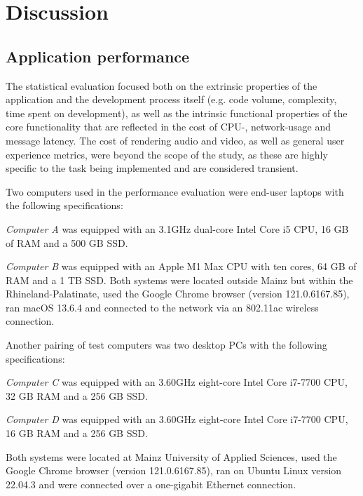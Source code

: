 \chapter{Discussion}
\label{ch:discussion}


\section{Application performance}
\label{sec:statistics}

The statistical evaluation focused both on the extrinsic properties of the application and the development process itself (e.g. code volume, complexity, time spent on development), as well as the intrinsic functional properties of the core functionality that are reflected in the cost of \ac{CPU}-, network-usage and message latency.
The cost of rendering audio and video, as well as general user experience metrics, were beyond the scope of the study, as these are highly specific to the task being implemented and are considered transient.

Two computers used in the performance evaluation were end-user laptops with the following specifications:

\emph{Computer A} was equipped with an 3.1GHz dual-core Intel Core i5 \ac{CPU}, 16 \ac{GB} of \ac{RAM} and a 500 \ac{GB} \ac{SSD}.

\emph{Computer B} was equipped with an Apple M1 Max \ac{CPU} with ten cores, 64 \ac{GB} of \ac{RAM} and a 1 \ac{TB} \ac{SSD}.
Both systems were located outside Mainz but within the Rhineland-Palatinate, used the Google Chrome browser (version 121.0.6167.85), ran macOS 13.6.4 and connected to the network via an 802.11ac wireless connection.

Another pairing of test computers was two desktop \acp{PC} with the following specifications:

\emph{Computer C} was equipped with an 3.60GHz eight-core Intel Core i7-7700 \ac{CPU}, 32 \ac{GB} \ac{RAM} and a 256 \ac{GB} \ac{SSD}.

\emph{Computer D} was equipped with an 3.60GHz eight-core Intel Core i7-7700 \ac{CPU}, 16 \ac{GB} \ac{RAM} and a 256 \ac{GB} \ac{SSD}.

Both systems were located at Mainz University of Applied Sciences, used the Google Chrome browser (version 121.0.6167.85), ran on Ubuntu Linux version 22.04.3 and were connected over a one-gigabit Ethernet connection.


